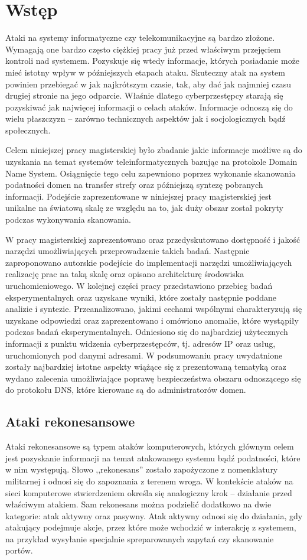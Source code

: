 \chapter{Wstęp}
\noindent Ataki na systemy informatyczne czy telekomunikacyjne są bardzo złożone. Wymagają one bardzo często ciężkiej pracy już przed
właściwym przejęciem kontroli nad systemem. Pozyskuje się wtedy informacje, których posiadanie może mieć istotny wpływ w późniejszych
etapach ataku. Skuteczny atak na system powinien przebiegać w jak najkrótszym czasie, tak, aby dać jak najmniej czasu drugiej stronie
na jego odparcie. Właśnie dlatego cyberprzestępcy starają się pozyskiwać jak najwięcej informacji o celach ataków. Informacje odnoszą
się do wielu płaszczyzn -- zarówno technicznych aspektów jak i socjologicznych bądź społecznych.

Celem niniejszej pracy magisterskiej było zbadanie jakie informacje możliwe są do uzyskania na temat systemów teleinformatycznych
bazując na protokole Domain Name System. Osiągnięcie tego celu zapewniono poprzez wykonanie skanowania podatności domen na transfer
strefy oraz późniejszą syntezę pobranych informacji. Podejście zaprezentowane w niniejszej pracy magisterskiej jest unikalne
na światową skalę ze względu na to, jak duży obszar został pokryty podczas wykonywania skanowania.

W pracy magisterskiej zaprezentowano oraz przedyskutowano dostępność i jakość narzędzi umożliwiających przeprowadzenie takich badań.
Następnie zaproponowano autorskie podejście do implementacji narzędzi umożliwiających realizację prac na taką skalę oraz opisano
architekturę środowiska uruchomieniowego. W kolejnej części pracy przedstawiono przebieg badań eksperymentalnych oraz uzyskane wyniki,
które zostały następnie poddane analizie i syntezie. Przeanalizowano, jakimi cechami wspólnymi charakteryzują się uzyskane odpowiedzi
oraz zaprezentowano i omówiono anomalie, które wystąpiły podczas badań eksperymentalnych. Odniesiono się do najbardziej użytecznych
informacji z punktu widzenia cyberprzestępców, tj. adresów IP oraz usług, uruchomionych pod danymi adresami. W podsumowaniu pracy
uwydatnione zostały najbardziej istotne aspekty wiążące się z prezentowaną tematyką oraz wydano zalecenia umożliwiające poprawę
bezpieczeństwa obszaru odnoszącego się do protokołu DNS, które kierowane są do administratorów domen.

\section{Ataki rekonesansowe}
\noindent Ataki rekonesansowe są typem ataków komputerowych, których głównym celem jest pozyskanie informacji na temat atakowanego systemu bądź
podatności, które w nim występują. Słowo ,,rekonesans'' zostało zapożyczone z nomenklatury militarnej i odnosi się do zapoznania z
terenem wroga. W kontekście ataków na sieci komputerowe stwierdzeniem określa się analogiczny krok -- działanie przed właściwym atakiem.
Sam rekonesans można podzielić dodatkowo na dwie kategorie: atak aktywny oraz pasywny.
Atak aktywny odnosi się do działania, gdy atakujący podejmuje akcje, przez które może wchodzić w interakcję z systemem, na przykład
wysyłanie specjalnie spreparowanych zapytań czy skanowanie portów.

